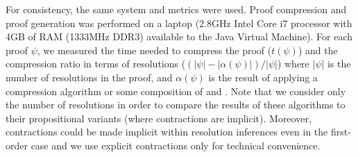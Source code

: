 {For consistency, the same system and metrics were used. Proof compression and proof generation was performed on a laptop (2.8GHz Intel Core i7 processor with 4GB of RAM (1333MHz DDR3) available to the Java Virtual Machine). For each proof $\psi$, we measured the time needed to compress the proof ($t(\psi)$) and the compression ratio in terms of resolutions ($(|\psi|-|\alpha(\psi)|)/|\psi|$) where $|\psi|$ is the number of resolutions in the proof, and $\alpha(\psi)$ is the result of applying a compression algorithm or some composition of {\FORPI} and {\GFOLU}. Note that we consider only the number of resolutions in order to compare the results of these algorithms to their propositional variants (where contractions are implicit). Moreover, contractions could be made implicit within resolution inferences even in the first-order case and we use explicit contractions only for technical convenience.




}
